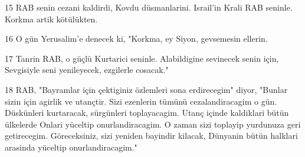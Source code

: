 \par 15 RAB senin cezani kaldirdi, Kovdu düsmanlarini. Israil'in Krali RAB seninle. Korkma artik kötülükten.
\par 16 O gün Yerusalim'e denecek ki, "Korkma, ey Siyon, gevsemesin ellerin.
\par 17 Tanrin RAB, o güçlü Kurtarici seninle. Alabildigine sevinecek senin için, Sevgisiyle seni yenileyecek, ezgilerle cosacak."
\par 18 RAB, "Bayramlar için çektiginiz özlemleri sona erdirecegim" diyor, "Bunlar sizin için agirlik ve utançtir. Sizi ezenlerin tümünü cezalandiracagim o gün. Düskünleri kurtaracak, sürgünleri toplayacagim. Utanç içinde kaldiklari bütün ülkelerde Onlari yüceltip onurlandiracagim. O zaman sizi toplayip yurdunuza geri getirecegim. Göreceksiniz, sizi yeniden bayindir kilacak, Dünyanin bütün halklari arasinda yüceltip onurlandiracagim."


